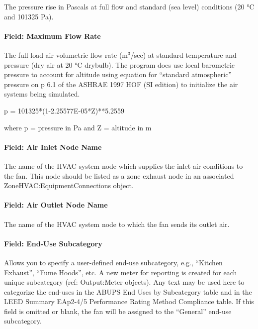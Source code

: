 The pressure rise in Pascals at full flow and standard (sea level) conditions (20 °C and 101325 Pa).

\paragraph{Field: Maximum Flow Rate}\label{field-maximum-flow-rate-3}

The full load air volumetric flow rate (m\(^{3}\)/sec) at standard temperature and pressure (dry air at 20 °C drybulb). The program does use local barometric pressure to account for altitude using equation for ``standard atmospheric'' pressure on p 6.1 of the ASHRAE 1997 HOF (SI edition) to initialize the air systems being simulated.

p = 101325*(1-2.25577E-05*Z)**5.2559

where p = pressure in Pa and Z = altitude in m

\paragraph{Field: Air Inlet Node Name}\label{field-air-inlet-node-name-3-000}

The name of the HVAC system node which supplies the inlet air conditions to the fan. This node should be listed as a zone exhaust node in an associated ZoneHVAC:EquipmentConnections object.

\paragraph{Field: Air Outlet Node Name}\label{field-air-outlet-node-name-3-000}

The name of the HVAC system node to which the fan sends its outlet air.

\paragraph{Field: End-Use Subcategory}\label{field-end-use-subcategory-3}

Allows you to specify a user-defined end-use subcategory, e.g., ``Kitchen Exhaust'', ``Fume Hoods'', etc. A new meter for reporting is created for each unique subcategory (ref: Output:Meter objects). Any text may be used here to categorize the end-uses in the ABUPS End Uses by Subcategory table and in the LEED Summary EAp2-4/5 Performance Rating Method Compliance table. If this field is omitted or blank, the fan will be assigned to the ``General'' end-use subcategory.

